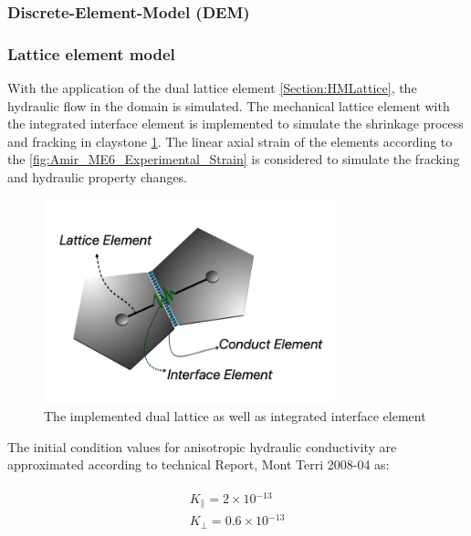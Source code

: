 \subsubsection*{Discrete-Element-Model (DEM)}

\subsubsection*{Lattice element model}
With the application of the dual lattice element \ref{Section:HMLattice}, the hydraulic flow in the domain is simulated. The mechanical lattice element with the integrated interface element \cite{Sattarietal2019b} is implemented to simulate the shrinkage process and fracking in claystone \ref{fig:Amir_ME6_Lattice_Model}. The linear axial strain of the elements according to the \ref{fig:Amir_ME6_Experimental_Strain} is considered to simulate the fracking and hydraulic property changes. 

\begin{figure}[!ht]
\centering
\includegraphics[width=0.75\textwidth]{figures/Amir_ME6_Lattice_Model.png}
\caption{The implemented dual lattice as well as integrated interface element}
\label{fig:Amir_ME6_Lattice_Model}
\end{figure} 

The initial condition values for anisotropic hydraulic conductivity are approximated according to technical Report, Mont Terri 2008-04 as:

\begin{align}
\label{eq:LEM_ME6_1}
\begin{split}
K_\parallel=2\times{10}{^{-13}}\\
K_\bot=0.6\times{10}{^{-13}}
\end{split}
\end{align}

